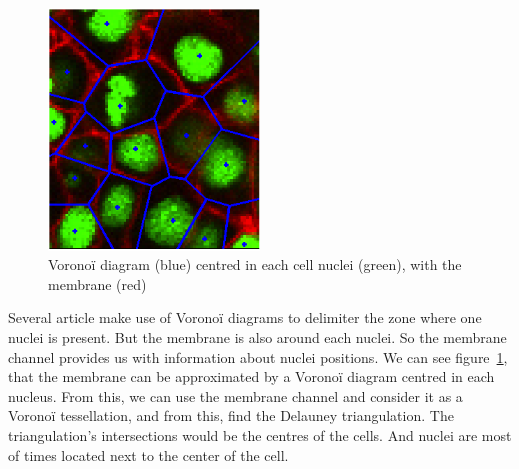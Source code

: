 \begin{figure}[h]
\begin{center}
\leavevmode
\includegraphics[width=0.5\textwidth]{pictures/voronoiExample2D}
\end{center}
\caption{Voronoï diagram (blue) centred in each cell nuclei (green), with the membrane (red)}
\label{fig:voronoiExample2D}
\end{figure}
Several article make use of Voronoï diagrams to delimiter the zone where one nuclei is present.
But the membrane is also around each nuclei. So the membrane channel provides us with information about nuclei positions.
We can see figure~\ref{fig:voronoiExample2D}, that the membrane can be approximated by a Voronoï diagram centred in each nucleus.
From this, we can use the membrane channel and consider it as a Voronoï tessellation, and from this, find the Delauney triangulation.
The triangulation's intersections would be the centres of the cells. And nuclei are most of times located next to the center of the cell.

\paragraph*{}

